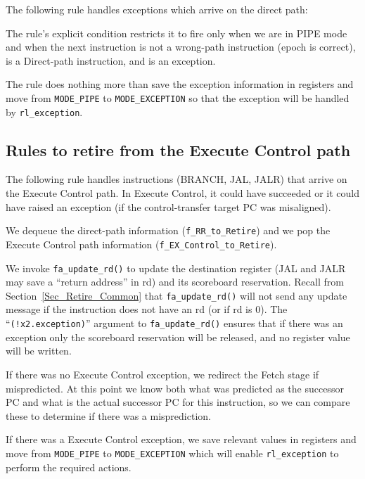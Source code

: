 The following rule handles exceptions which arrive on the direct path:



The rule's explicit condition restricts it to fire only when we are in
PIPE mode and when the next instruction is not a wrong-path
instruction (epoch is correct), is a Direct-path instruction, and is
an exception.

The rule does nothing more than save the exception information in
registers and move from \verb|MODE_PIPE| to \verb|MODE_EXCEPTION| so
that the exception will be handled by \verb|rl_exception|.


\subsection{Rules to retire from the Execute Control path}

\label{Sec_Fife_Retire_Control}

The following rule handles instructions (BRANCH, JAL, JALR) that
arrive on the Execute Control path.  In Execute Control, it could have
succeeded or it could have raised an exception (if the
control-transfer target PC was misaligned).



We dequeue the direct-path information (\verb|f_RR_to_Retire|) and we
pop the Execute Control path information
(\verb|f_EX_Control_to_Retire|).

We invoke \verb|fa_update_rd()| to update the destination register
(JAL and JALR may save a ``return address'' in rd) and its scoreboard
reservation.  Recall from Section~\ref{Sec_Retire_Common} that
\verb|fa_update_rd()| will not send any update message if the
instruction does not have an rd (or if rd is 0).  The
``\verb|(!x2.exception)|'' argument to \verb|fa_update_rd()| ensures
that if there was an exception only the scoreboard reservation will be
released, and no register value will be written.

If there was no Execute Control exception, we redirect the Fetch stage
if mispredicted.  At this point we know both what was predicted as the
successor PC and what is the actual successor PC for this instruction,
so we can compare these to determine if there was a misprediction.

If there was a Execute Control exception, we save relevant values in
registers and move from \verb|MODE_PIPE| to \verb|MODE_EXCEPTION|
which will enable \verb|rl_exception| to perform the required actions.


